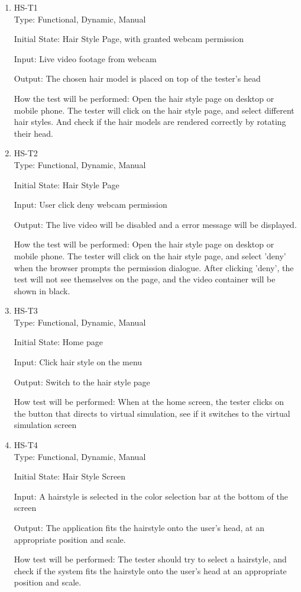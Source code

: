 \documentclass[12pt, titlepage]{article}
\begin{document}
\begin{enumerate}

\item{HS-T1\\}
Type: Functional, Dynamic, Manual
					
Initial State: Hair Style Page, with granted webcam permission
					
Input: Live video footage from webcam
					
Output: The chosen hair model is placed on top of the tester's head

How the test will be performed: Open the hair style page on desktop or mobile phone. The tester will click on the hair style page, and select different hair styles. And check if the hair models are rendered correctly by rotating their head.
					

\item{HS-T2\\}
Type: Functional, Dynamic, Manual
					
Initial State: Hair Style Page
					
Input: User click deny webcam permission
					
Output: The live video will be disabled and a error message will be displayed.

How the test will be performed: Open the hair style page on desktop or mobile phone. The tester will click on the hair style page, and select 'deny' when the browser prompts the permission dialogue. After clicking 'deny', the test will not see themselves on the page, and the video container will be shown in black.

\item{HS-T3\\}
Type: Functional, Dynamic, Manual
                    
Initial State: Home page
					
Input: Click hair style on the menu
					
Output: Switch to the hair style page
					
How test will be performed: When at the home screen, the tester clicks on the button that directs to virtual simulation, see if it switches to the virtual simulation screen

\item{HS-T4\\}
Type: Functional, Dynamic, Manual
                    
Initial State: Hair Style Screen
					
Input: A hairstyle is selected in the color selection bar at the bottom of the screen
					
Output: The application fits the hairstyle onto the user's head, at an appropriate position and scale. 
					
How test will be performed: The tester should try to select a hairstyle, and check if the system fits the hairstyle onto the user's head at an appropriate position and scale.
\end{enumerate}
\end{document}
